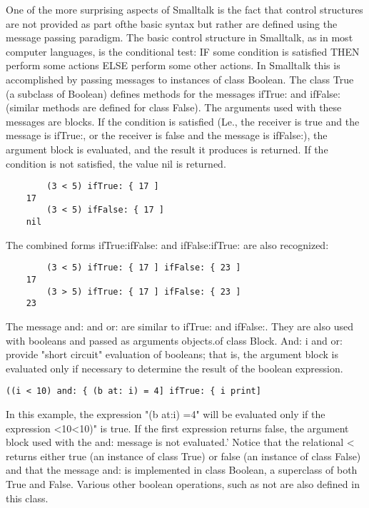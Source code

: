 
One of the more surprising aspects of Smalltalk is the fact that control
structures are not provided as part ofthe basic syntax but rather are defined
using the message passing paradigm. The basic control structure in Smalltalk, as in most computer languages, is the conditional test: IF some condition is satisfied THEN perform some actions ELSE perform some other
actions. In Smalltalk this is accomplished by passing messages to instances
of class Boolean. The class True (a subclass of Boolean) defines methods
for the messages ifTrue: and ifFalse: (similar methods are defined for class
False). The arguments used with these messages are blocks. If the condition is satisfied (Le., the receiver is true and the message is ifTrue:, or
the receiver is false and the message is ifFalse:), the argument block is
evaluated, and the result it produces is returned. If the condition is not
satisfied, the value nil is returned.
\begin{lstlisting}
        (3 < 5) ifTrue: { 17 ]
    17
        (3 < 5) ifFalse: { 17 ]
    nil
\end{lstlisting}

The combined forms ifTrue:ifFalse: and ifFalse:ifTrue: are also recognized:
\begin{lstlisting}
        (3 < 5) ifTrue: { 17 ] ifFalse: { 23 ]
    17
        (3 > 5) ifTrue: { 17 ] ifFalse: { 23 ]
    23
\end{lstlisting}

The message and: and or: are similar to ifTrue: and ifFalse:. They are
also used with booleans and passed as arguments objects.of class Block.
And: i and or: provide "short circuit" evaluation of booleans; that is, the
argument block is evaluated only if necessary to determine the result of
the boolean expression.
\begin{lstlisting}
((i < 10) and: { (b at: i) = 4] ifTrue: { i print]
\end{lstlisting}
In this example, the expression "(b at:i) =4" will be evaluated only if the
expression <10<10)" is true. If the first expression returns false, the argument block used with the and: message is not 
evaluated.' Notice that the
relational < returns either true (an instance of class True) or false (an
instance of class False) and that the message and: is implemented in class
Boolean, a superclass of both True and False. Various other boolean
operations, such as not are also defined in this class.

